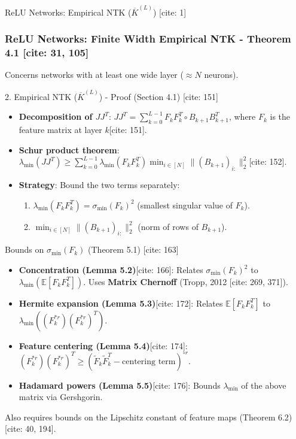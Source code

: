 \documentclass{beamer}
\theoremstyle{definition}
\theoremstyle{remark}
\newcommand{\E}{\mathbb{E}}
\newcommand{\lambdaMin}{\lambda_{\min}}
\newcommand{\sigmaMin}{\sigma_{\min}}
\begin{document}
\begin{frame}{ReLU Networks: Empirical NTK ($\overline{K}^{(L)}$) [cite: 1]}
  \frametitle{ReLU Networks: Finite Width Empirical NTK - Theorem 4.1 [cite: 31, 105]}
   \justify
  Concerns networks with at least one wide layer ($\approx N$ neurons).

  \begin{block}{2. Empirical NTK ($\overline{K}^{(L)}$) - Proof (Section 4.1) [cite: 151]}
    \begin{itemize}
      \item \textbf{Decomposition of $JJ^T$}: $JJ^T = \sum_{k=0}^{L-1} F_k F_k^T \circ B_{k+1} B_{k+1}^T$, where $F_k$ is the feature matrix at layer $k$[cite: 151].
      \item \textbf{Schur product theorem}: $\lambdaMin(JJ^T) \ge \sum_{k=0}^{L-1} \lambdaMin(F_k F_k^T) \min_{i \in [N]} \|(B_{k+1})_{i:}\|_2^2$[cite: 152].
      \item \textbf{Strategy}: Bound the two terms separately:
      \begin{enumerate}
        \item $\lambdaMin(F_k F_k^T) = \sigmaMin(F_k)^2$ (smallest singular value of $F_k$).
        \item $\min_{i \in [N]} \|(B_{k+1})_{i:}\|_2^2$ (norm of rows of $B_{k+1}$).
      \end{enumerate}
    \end{itemize}
  \end{block}
  \pause
  \begin{block}{Bounds on $\sigmaMin(F_k)$ (Theorem 5.1) [cite: 163]}
    \begin{itemize}
      \item \textbf{Concentration (Lemma 5.2)}[cite: 166]: Relates $\sigmaMin(F_k)^2$ to $\lambdaMin(\E[F_k F_k^T])$. Uses \textbf{Matrix Chernoff} (Tropp, 2012 [cite: 269, 371]).
      \item \textbf{Hermite expansion (Lemma 5.3)}[cite: 172]: Relates $\E[F_k F_k^T]$ to $\lambdaMin((F_k^{\ast r})(F_k^{\ast r})^T)$.
      \item \textbf{Feature centering (Lemma 5.4)}[cite: 174]: $(F_k^{\ast r})(F_k^{\ast r})^T \ge (\tilde{F}_k \tilde{F}_k^T - \text{centering term})^{\circ r}$.
      \item \textbf{Hadamard powers (Lemma 5.5)}[cite: 176]: Bounds $\lambdaMin$ of the above matrix via Gershgorin.
    \end{itemize}
  \end{block}
   \justify
  Also requires bounds on the Lipschitz constant of feature maps (Theorem 6.2)[cite: 40, 194].
\end{frame}
\end{document}
